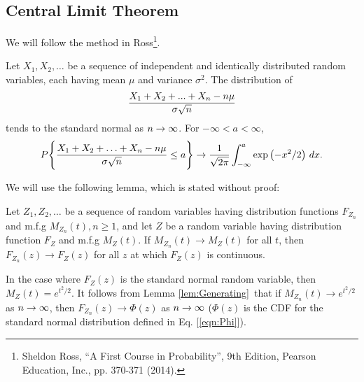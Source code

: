 \subsection{Central Limit Theorem}
\label{sec:CentralLimit}
We will follow the method in Ross\footnote{Sheldon Ross, ``A First Course in Probability'', 9th Edition, Pearson Education, Inc., pp. 370-371 (2014).}.
\begin{theorem}
\label{thm:CentralLimit}
Let $X_1, X_2, \hdots$ be a sequence of independent and identically distributed random variables, each having mean $\mu$ and variance $\sigma^2$. The
distribution of 
$${X_1 + X_2 + ... + X_n  - n\mu\over\sigma\sqrt{n}}$$ tends to the standard normal as $n\rightarrow\infty$. For $-\infty < a < \infty$,
$$ P\Bigg\{ {X_1 + X_2 +\hdots + X_n - n\mu \over \sigma\sqrt{n} } \le a \Bigg\} \rightarrow {1\over \sqrt{2\pi}} \int_{-\infty}^a \exp\left(-{x^2 / 2}\right)\,dx.$$
\end{theorem}
We will use the following lemma, which is stated without proof:\\
\begin{lemma}
\label{lem:Generating}
Let $Z_1, Z_2, \hdots$ be a sequence of random variables having distribution functions $F_{Z_n}$ and m.f.g $M_{Z_n}(t) , n\ge 1$, and let $Z$ be a random variable having distribution function $F_Z$ and m.f.g $M_Z(t)$. If 
$M_{Z_n}(t) \to M_Z(t)$ for all $t$, then $F_{Z_n}(z) \to F_Z(z)$ for all $z$ at which $F_Z(z)$ is continuous. 
\end{lemma}
In the case where $F_Z(z)$ is the standard normal random variable, then $M_Z(t) = e^{t^2/2}$. It follows from Lemma \ref{lem:Generating}\ that if 
$M_{Z_n}(t) \to e^{t^2/2}$ as $n\rightarrow\infty$, then $F_{Z_n}(z) \to \Phi(z)$ as $n\rightarrow\infty$ ($\Phi(z)$ is the CDF for the standard normal distribution defined in 
Eq. [\ref{eqn:Phi}]).
